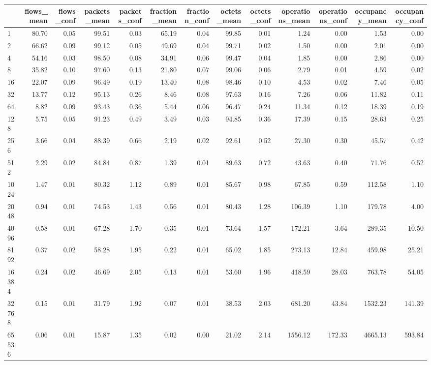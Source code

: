 \begin{tabular}{lrrrrrrrrrrrr}
\toprule
 & flows_mean & flows_conf & packets_mean & packets_conf & fraction_mean & fraction_conf & octets_mean & octets_conf & operations_mean & operations_conf & occupancy_mean & occupancy_conf \\
\midrule
1 & 80.70 & 0.05 & 99.51 & 0.03 & 65.19 & 0.04 & 99.85 & 0.01 & 1.24 & 0.00 & 1.53 & 0.00 \\
2 & 66.62 & 0.09 & 99.12 & 0.05 & 49.69 & 0.04 & 99.71 & 0.02 & 1.50 & 0.00 & 2.01 & 0.00 \\
4 & 54.16 & 0.03 & 98.50 & 0.08 & 34.91 & 0.06 & 99.47 & 0.04 & 1.85 & 0.00 & 2.86 & 0.00 \\
8 & 35.82 & 0.10 & 97.60 & 0.13 & 21.80 & 0.07 & 99.06 & 0.06 & 2.79 & 0.01 & 4.59 & 0.02 \\
16 & 22.07 & 0.09 & 96.49 & 0.19 & 13.40 & 0.08 & 98.46 & 0.10 & 4.53 & 0.02 & 7.46 & 0.05 \\
32 & 13.77 & 0.12 & 95.13 & 0.26 & 8.46 & 0.08 & 97.63 & 0.16 & 7.26 & 0.06 & 11.82 & 0.11 \\
64 & 8.82 & 0.09 & 93.43 & 0.36 & 5.44 & 0.06 & 96.47 & 0.24 & 11.34 & 0.12 & 18.39 & 0.19 \\
128 & 5.75 & 0.05 & 91.23 & 0.49 & 3.49 & 0.03 & 94.85 & 0.36 & 17.39 & 0.15 & 28.63 & 0.25 \\
256 & 3.66 & 0.04 & 88.39 & 0.66 & 2.19 & 0.02 & 92.61 & 0.52 & 27.30 & 0.30 & 45.57 & 0.42 \\
512 & 2.29 & 0.02 & 84.84 & 0.87 & 1.39 & 0.01 & 89.63 & 0.72 & 43.63 & 0.40 & 71.76 & 0.52 \\
1024 & 1.47 & 0.01 & 80.32 & 1.12 & 0.89 & 0.01 & 85.67 & 0.98 & 67.85 & 0.59 & 112.58 & 1.10 \\
2048 & 0.94 & 0.01 & 74.53 & 1.43 & 0.56 & 0.01 & 80.43 & 1.28 & 106.39 & 1.10 & 179.78 & 4.00 \\
4096 & 0.58 & 0.01 & 67.28 & 1.70 & 0.35 & 0.01 & 73.64 & 1.57 & 172.21 & 3.64 & 289.35 & 10.50 \\
8192 & 0.37 & 0.02 & 58.28 & 1.95 & 0.22 & 0.01 & 65.02 & 1.85 & 273.13 & 12.84 & 459.98 & 25.21 \\
16384 & 0.24 & 0.02 & 46.69 & 2.05 & 0.13 & 0.01 & 53.60 & 1.96 & 418.59 & 28.03 & 763.78 & 54.05 \\
32768 & 0.15 & 0.01 & 31.79 & 1.92 & 0.07 & 0.01 & 38.53 & 2.03 & 681.20 & 43.84 & 1532.23 & 141.39 \\
65536 & 0.06 & 0.01 & 15.87 & 1.35 & 0.02 & 0.00 & 21.02 & 2.14 & 1556.12 & 172.33 & 4665.13 & 593.84 \\

\end{tabular}
